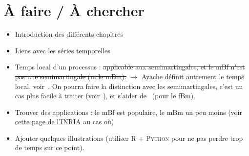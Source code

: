 



\section{À faire / À chercher}
\begin{itemize}
\item Introduction des différents chapitres
\item Liens avec les séries temporelles
\item Temps local d'un processus : \st{applicable aux semimartingales,
    et le mBf n'est pas une semimartingale (ni le mBm).}
  $\longrightarrow$ Ayache définit autrement le temps local,
  voir~\cite[Sec.~2.2]{ayache2018}. On pourra faire la distinction
  avec les semimartingales, c'est un cas plus facile à traiter
  (voir~\cite[p.~13-14]{yen2013}), et s'aider
  de~\cite[Sec.~10.1]{biagini2008} (pour le fBm).
\item Trouver des applications : le mBf est populaire, le mBm un peu
  moins (voir
  \href{https://team.inria.fr/anja/english-theoretical-aspects/multifractional-brownian-motion/multifractional-brownian-motion-bibliography/}{cette page de l'INRIA}
  au cas où)
\item Ajouter quelques illustrations (utiliser \textsc{R} +
  \textsc{Python} pour ne pas perdre trop de temps sur ce point).
\end{itemize}
